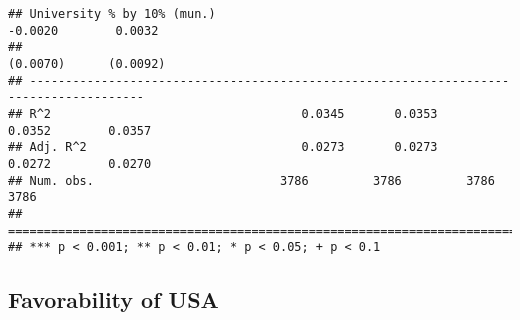 \documentclass[
]{article}
\begin{document}
\begin{verbatim}
## University % by 10% (mun.)                                     -0.0020        0.0032  
##                                                                (0.0070)      (0.0092) 
## --------------------------------------------------------------------------------------
## R^2                                   0.0345       0.0353       0.0352        0.0357  
## Adj. R^2                              0.0273       0.0273       0.0272        0.0270  
## Num. obs.                          3786         3786         3786          3786       
## ======================================================================================
## *** p < 0.001; ** p < 0.01; * p < 0.05; + p < 0.1
\end{verbatim}

\hypertarget{favorability-of-usa-4}{%
\subsection{Favorability of USA}\label{favorability-of-usa-4}}
\end{document}
